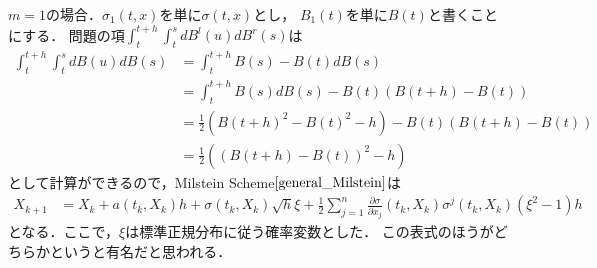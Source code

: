 \documentclass[dvipdfmx,autodetect-engine]{jsarticle}
\theoremstyle{remark}
\theoremstyle{definition}
\begin{document}
$m=1$の場合．$\sigma_{1}(t,x)$を単に$\sigma(t,x)$とし，
$B_{1}(t)$を単に$B(t)$と書くことにする．
問題の項$\int_{t}^{t+h} \int_{t}^{s} dB^{l}(u) dB^{r}(s)$は
\begin{align}
    \int_{t}^{t+h} \int_{t}^{s} dB(u) dB(s) 
    &= \int_{t}^{t+h} B(s)-B(t) dB(s) \\
    &= \int_{t}^{t+h} B(s) dB(s) - B(t)(B(t+h)-B(t)) \\
    &= \frac{1}{2}\left(B(t+h)^{2} - B(t)^{2} - h\right) - B(t)(B(t+h)-B(t)) \\
    &= \frac{1}{2}\left((B(t+h)-B(t))^{2} -h\right)
\end{align}
として計算ができるので，Milstein Scheme$\eqref{general_Milstein}$は
\begin{align}
    X_{k+1} &= X_{k} + a(t_{k},X_{k})h 
     + \sigma(t_{k},X_{k})\sqrt{h}\xi + \frac{1}{2}
     \sum_{j=1}^{n} \frac{\partial \sigma}{\partial x_{j}}
     (t_{k},X_{k})\sigma^{j} (t_{k},X_{k}) (\xi^2 - 1)h
\end{align}
となる．ここで，$\xi$は標準正規分布に従う確率変数とした．
この表式のほうがどちらかというと有名だと思われる．
\end{document}
